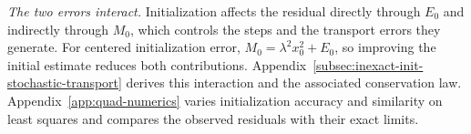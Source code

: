 \emph{The two errors interact.} Initialization affects the residual
directly through $E_0$ and indirectly through $M_0$, which controls the
steps and the transport errors they generate. For centered initialization
error, $M_0=\lambda^2x_0^2+E_0$, so improving the initial estimate reduces
both contributions. Appendix~\ref{subsec:inexact-init-stochastic-transport}
derives this interaction and the associated conservation law.
Appendix~\ref{app:quad-numerics} varies initialization accuracy and
similarity on least squares and compares the observed residuals with
their exact limits.
